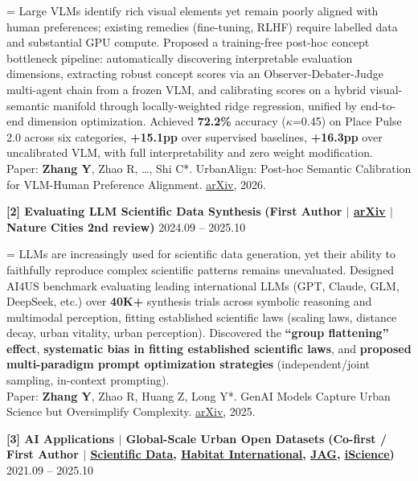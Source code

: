 \documentclass[10pt,a4paper]{article}
\let\oldhref\href
\renewcommand{\href}[2]{\oldhref{#1}{\underline{#2}}}
\newcommand{\project}[3]{%
  \vspace{1pt}
  {\textbf{#1}} {\textbf{(#3)}} \hfill {\color{lightgray}#2}\par\vspace{0pt}
}
\newlength{\projectnumwidth}
\begin{document}
\begingroup\leftskip=\projectnumwidth
Large VLMs identify rich visual elements yet remain poorly aligned with human preferences; existing remedies (fine-tuning, RLHF) require labelled data and substantial GPU compute. Proposed a training-free post-hoc concept bottleneck pipeline: automatically discovering interpretable evaluation dimensions, extracting robust concept scores via an Observer-Debater-Judge multi-agent chain from a frozen VLM, and calibrating scores on a hybrid visual-semantic manifold through locally-weighted ridge regression, unified by end-to-end dimension optimization. Achieved \textbf{72.2\%} accuracy ($\kappa$=0.45) on Place Pulse 2.0 across six categories, \textbf{+15.1pp} over supervised baselines, \textbf{+16.3pp} over uncalibrated VLM, with full interpretability and zero weight modification.\\[2pt]
{Paper: \textbf{Zhang Y}, Zhao R, \ldots, Shi C*. UrbanAlign: Post-hoc Semantic Calibration for VLM-Human Preference Alignment. \href{https://arxiv.org/abs/2602.19442}{arXiv}, 2026.}\par
\endgroup

\vspace{12pt}
\project{[2] Evaluating LLM Scientific Data Synthesis}{2024.09 -- 2025.10}
{First Author $|$ \href{https://arxiv.org/abs/2505.13803}{arXiv} $|$ Nature Cities 2nd review}

\begingroup\leftskip=\projectnumwidth
LLMs are increasingly used for scientific data generation, yet their ability to faithfully reproduce complex scientific patterns remains unevaluated. Designed AI4US benchmark evaluating leading international LLMs (GPT, Claude, GLM, DeepSeek, etc.) over \textbf{40K+} synthesis trials across symbolic reasoning and multimodal perception, fitting established scientific laws (scaling laws, distance decay, urban vitality, urban perception). Discovered the \textbf{``group flattening'' effect}, \textbf{systematic bias in fitting established scientific laws}, and \textbf{proposed multi-paradigm prompt optimization strategies} (independent/joint sampling, in-context prompting).\\[2pt]
{Paper: \textbf{Zhang Y}, Zhao R, Huang Z, Long Y*. GenAI Models Capture Urban Science but Oversimplify Complexity. \href{https://arxiv.org/abs/2505.13803}{arXiv}, 2025.}\par
\endgroup

\vspace{12pt}
\project{[3] AI Applications $|$ Global-Scale Urban Open Datasets}{2021.09 -- 2025.10}
{Co-first / First Author $|$ \href{https://doi.org/10.1038/s41597-025-04730-5}{Scientific Data}, \href{https://doi.org/10.1016/j.habitatint.2025.103350}{Habitat International}, \href{https://doi.org/10.1016/j.jag.2022.102942}{JAG}, \href{https://doi.org/10.1016/j.isci.2024.110125}{iScience}}
\end{document}
